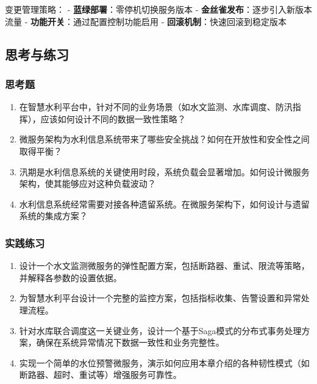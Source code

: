 变更管理策略： - \textbf{蓝绿部署}：零停机切换服务版本 -
\textbf{金丝雀发布}：逐步引入新版本流量 -
\textbf{功能开关}：通过配置控制功能启用 -
\textbf{回滚机制}：快速回滚到稳定版本

\subsection{思考与练习}\label{ux601dux8003ux4e0eux7ec3ux4e60}

\subsubsection{思考题}\label{ux601dux8003ux9898}

\begin{enumerate}
\def\labelenumi{\arabic{enumi}.}
\item
  在智慧水利平台中，针对不同的业务场景（如水文监测、水库调度、防汛指挥），应该如何设计不同的数据一致性策略？
\item
  微服务架构为水利信息系统带来了哪些安全挑战？如何在开放性和安全性之间取得平衡？
\item
  汛期是水利信息系统的关键使用时段，系统负载会显著增加。如何设计微服务架构，使其能够应对这种负载波动？
\item
  水利信息系统经常需要对接各种遗留系统。在微服务架构下，如何设计与遗留系统的集成方案？
\end{enumerate}

\subsubsection{实践练习}\label{ux5b9eux8df5ux7ec3ux4e60}

\begin{enumerate}
\def\labelenumi{\arabic{enumi}.}
\item
  设计一个水文监测微服务的弹性配置方案，包括断路器、重试、限流等策略，并解释各参数的设置依据。
\item
  为智慧水利平台设计一个完整的监控方案，包括指标收集、告警设置和异常处理流程。
\item
  针对水库联合调度这一关键业务，设计一个基于Saga模式的分布式事务处理方案，确保在系统异常情况下数据一致性和业务完整性。
\item
  实现一个简单的水位预警微服务，演示如何应用本章介绍的各种韧性模式（如断路器、超时、重试等）增强服务可靠性。
\end{enumerate}
